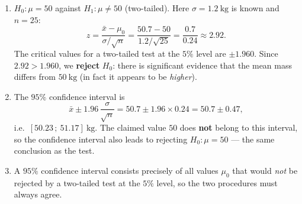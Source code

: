 \documentclass[11pt]{article}
\begin{document}
\begin{corrige}
\begin{enumerate}
\item $H_0: \mu = 50$ against $H_1: \mu \neq 50$ (two-tailed). Here $\sigma = 1.2\ \mathrm{kg}$ is known and $n = 25$:
\[ z = \frac{\bar{x} - \mu_0}{\sigma/\sqrt{n}} = \frac{50.7 - 50}{1.2/\sqrt{25}} = \frac{0.7}{0.24} \approx 2.92. \]
The critical values for a two-tailed test at the $5\%$ level are $\pm 1.960$. Since $2.92 > 1.960$, we \textbf{reject} $H_0$: there is significant evidence that the mean mass differs from $50\ \mathrm{kg}$ (in fact it appears to be \emph{higher}).
\item The $95\%$ confidence interval is
\[ \bar{x} \pm 1.96\,\frac{\sigma}{\sqrt{n}} = 50.7 \pm 1.96 \times 0.24 = 50.7 \pm 0.47, \]
i.e.\ $[50.23\,;\ 51.17]\ \mathrm{kg}$. The claimed value $50$ does \textbf{not} belong to this interval, so the confidence interval also leads to rejecting $H_0: \mu = 50$ — the same conclusion as the test.
\item A $95\%$ confidence interval consists precisely of all values $\mu_0$ that would \emph{not} be rejected by a two-tailed test at the $5\%$ level, so the two procedures must always agree.
\end{enumerate}
\end{corrige}
\end{document}
